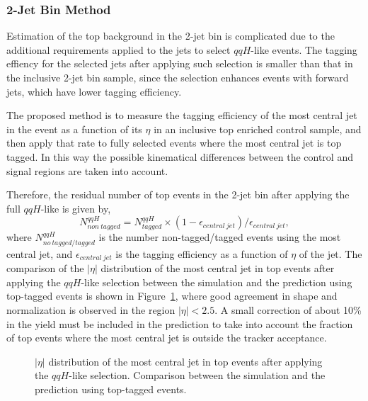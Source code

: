 %
% 
\subsubsection{2-Jet Bin Method}
Estimation of the top background in the 2-jet bin is complicated due to 
the additional requirements applied to the jets to
select $qqH$-like events. The tagging effiency for the selected jets 
after applying such selection is smaller than that in the inclusive 
2-jet bin sample, since the selection enhances events with forward 
jets, which have lower tagging efficiency.

The proposed method is to measure the tagging efficiency of the most central 
jet in the event as a function of its $\eta$ in an inclusive top 
enriched control sample, and then apply that rate to fully selected events 
where the most central jet is top tagged. In this way the 
possible kinematical differences between the control and signal regions 
are taken into account.

Therefore, the residual number of top events in the 2-jet bin after applying the full 
$qqH$-like is given by,
$${N_{non~tagged}^{qqH} = N_{tagged}^{qqH} \times (1-\epsilon_{central~jet})/\epsilon_{central~jet}},$$
where $N_{no~tagged/tagged}^{qqH}$ is the number non-tagged/tagged events using 
the most central jet, and $\epsilon_{central~jet}$ is the 
tagging efficiency as a function of $\eta$ of the jet. The comparison of the 
$|\eta|$ distribution of the most central jet in top events after applying the $qqH$-like selection between the simulation and 
the prediction using top-tagged events is shown in Figure~\ref{fig:vbf_btagprediction_jetmin}, where 
good agreement in shape and normalization is observed in the region $|\eta|<2.5$. A small correction 
of about 10\% in the yield must be included in the prediction to take into account the fraction 
of top events where the most central jet is outside the tracker acceptance.

\begin{figure}[!htbp]
\begin{center}
\caption{\fixme $|\eta|$ distribution of the most central jet in top events after 
applying the $qqH$-like selection. Comparison between the simulation and 
the prediction using top-tagged events.}
\label{fig:vbf_btagprediction_jetmin}
\end{center}
\end{figure}

